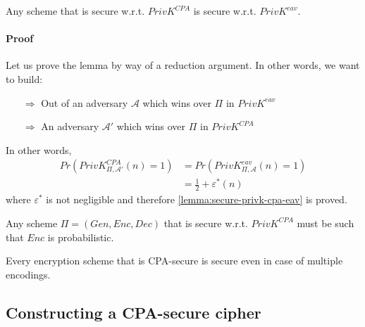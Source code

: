 \documentclass[../main]{subfiles}
\begin{document}
\begin{lemma}
	\label{lemma:secure-privk-cpa-eav}
	Any scheme that is secure w.r.t. $PrivK^{CPA}$ is secure w.r.t. $PrivK^{eav}.$
\end{lemma}

\paragraph{Proof}
Let us prove the lemma by way of a reduction argument. In other words, we want to build:
\begin{itemize}
	\item[$\Rightarrow{}$] Out of an adversary $\mathcal{A}$ which wins over $\Pi{}$ in $PrivK^{eav}$
	\item[$\Rightarrow{}$] An adversary $\mathcal{A}'$ which wins over $\Pi{}$ in $PrivK^{CPA}$
\end{itemize}
In other words,
\begin{align*}
    Pr(PrivK^{CPA}_{\Pi{}, \mathcal{A}'}(n)=1) &= Pr(PrivK^{eav}_{\Pi{}, \mathcal{A}}(n)=1) \\
    &= \frac{1}{2} + \varepsilon^*(n)
\end{align*}
where $\varepsilon^*$ is not negligible and therefore \ref{lemma:secure-privk-cpa-eav} is proved.

\begin{lemma}
    Any scheme $\Pi{}=(Gen, Enc, Dec)$ that is secure w.r.t. $PrivK^{CPA}$ must be such that $Enc$ is probabilistic.
\end{lemma}

\begin{theorem}
    Every encryption scheme that is CPA-secure is secure even in case of multiple encodings.
\end{theorem}

\subsection{Constructing a CPA-secure cipher}
\end{document}
